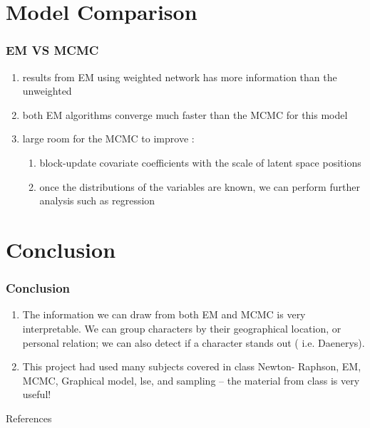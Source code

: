 \documentclass{beamer}
\begin{document}
%
%


\section{Model Comparison}
\begin{frame}
\frametitle{EM VS MCMC}
\begin{enumerate}[a]
\item results from EM using weighted network has more information than the unweighted
\item both EM algorithms converge much faster than the MCMC for this model
\item large room for the MCMC to improve : 
\begin{enumerate}[i]
\item block-update covariate coefficients with the scale of latent space positions 
\item once the distributions of the variables are known, we can perform further analysis such as regression
\end{enumerate}
\end{enumerate}
\end{frame}

%
%

\section{Conclusion}
\begin{frame}
\frametitle{Conclusion}
\begin{enumerate}
\item The information we can draw from both EM and MCMC is very interpretable. We can group characters by their geographical location, or personal relation; we can also detect if a character stands out ( i.e. Daenerys).
\item This project had used many subjects covered in class Newton- Raphson, EM, MCMC, Graphical model, lse, and sampling -- the material from class is very useful!
\end{enumerate}
\end{frame}

\begin{frame}{References}
\nocite{*}
\printbibliography
\end{frame}
\end{document}
